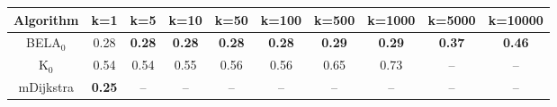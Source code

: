\begin{tabular}{c|ccccccccc}\toprule
Algorithm & k=1 & k=5 & k=10 & k=50 & k=100 & k=500 & k=1000 & k=5000 & k=10000 \\ \midrule
BELA$_0$ & 0.28 & \textbf{0.28} & \textbf{0.28} & \textbf{0.28} & \textbf{0.28} & \textbf{0.29} & \textbf{0.29} & \textbf{0.37} & \textbf{0.46} \\
K$_0$ & 0.54 & 0.54 & 0.55 & 0.56 & 0.56 & 0.65 & 0.73 & -- & -- \\
mDijkstra & \textbf{0.25} & -- & -- & -- & -- & -- & -- & -- & -- \\ \bottomrule 
\end{tabular}
